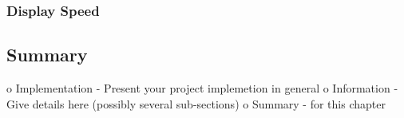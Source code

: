 \subsubsection{Display Speed}


\subsection{Summary}
\label{subsec:summary}


o   Implementation - Present your project implemetion in general
o   Information - Give details here (possibly several sub-sections)
o   Summary - for this chapter

% 
